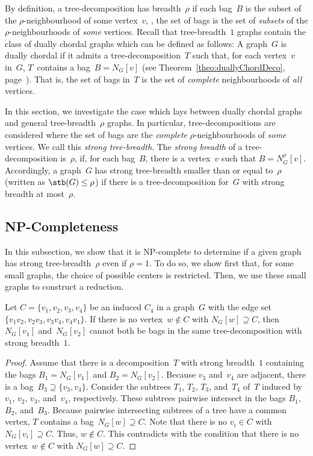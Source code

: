 
By definition, a tree-decomposition has breadth~$\rho$ if each bag~$B$ is the subset of the $\rho$-neighbourhood of some vertex~$v$, \ie, the set of bags is the set of \emph{subsets} of the $\rho$-neighbourhoods of \emph{some} vertices.
Recall that tree-breadth~$1$ graphs contain the class of dually chordal graphs which can be defined as follows:
A graph~$G$ is dually chordal if it admits a tree-decomposition~$T$ such that, for each vertex~$v$ in~$G$, $T$~contains a bag~$B = N_G[v]$ (see Theorem~\ref{theo:duallyChordDeco}, page~\pageref{theo:duallyChordDeco}).
That is, the set of bags in~$T$ is the set of \emph{complete} neighbourhoods of \emph{all} vertices.

In this section, we investigate the case which lays between dually chordal graphs and general tree-breadth~$\rho$ graphs.
In particular, tree-decompositions are considered where the set of bags are the \emph{complete} $\rho$-neighbourhoods of \emph{some} vertices.
We call this \emph{strong tree-breadth}.
The \emph{strong breadth} of a tree-decomposition is~$\rho$, if, for each bag~$B$, there is a vertex~$v$ such that $B = N_G^\rho[v]$.
Accordingly, a graph~$G$ has strong tree-breadth smaller than or equal to~$\rho$ (written as $\stb(G) \leq \rho$) if there is a tree-decomposition for~$G$ with strong breadth at most~$\rho$.


\subsection{NP-Completeness}

In this subsection, we show that it is NP-complete to determine if a given graph has strong tree-breadth~$\rho$ even if $\rho = 1$.
To do so, we show first that, for some small graphs, the choice of possible centers is restricted.
Then, we use these small graphs to construct a reduction.

\begin{lemma}
    \label{lem:C4AdjVert}
Let \( C = \{ v_1, v_2, v_3, v_4 \} \) be an induced \( C_4 \) in a graph~\( G \) with the edge set \( \{ v_1v_2, v_2v_3, v_3v_4, v_4v_1 \} \).
If there is no vertex~\( w \notin C \) with \( N_G[w] \supseteq C \), then \( N_G[v_1] \) and~\( N_G[v_2] \) cannot both be bags in the same tree-decomposition with strong breadth~\( 1 \).
\end{lemma}

\begin{proof}
Assume that there is a decomposition~$T$ with strong breadth~$1$ containing the bags $B_1 = N_G[v_1]$ and $B_2 = N_G[v_2]$.
Because $v_3$ and~$v_4$ are adjacent, there is a bag~$B_3 \supseteq \{ v_3, v_4 \}$.
Consider the subtrees $T_1$, $T_2$, $T_3$, and~$T_4$ of~$T$ induced by $v_1$, $v_2$, $v_3$, and~$v_4$, respectively.
These subtrees pairwise intersect in the bags $B_1$, $B_2$, and~$B_3$.
Because pairwise intersecting subtrees of a tree have a common vertex, $T$ contains a bag~$N_G[w] \supseteq C$.
Note that there is no $v_i \in C$ with $N_G[v_i] \supseteq C$.
Thus, $w \notin C$.
This contradicts with the condition that there is no vertex~$w \notin C$ with $N_G[w] \supseteq C$.
\end{proof}

